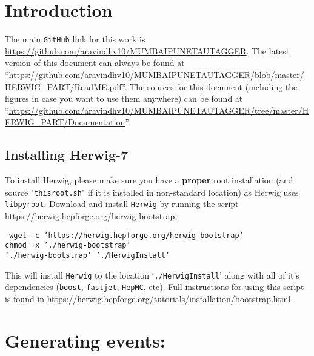 \section{Introduction}
The main {\tt GitHub} link for this work is \url{https://github.com/aravindhv10/MUMBAIPUNETAUTAGGER}.
The latest version of this document can always be found at ``\url{https://github.com/aravindhv10/MUMBAIPUNETAUTAGGER/blob/master/HERWIG_PART/ReadME.pdf}''.
The sources for this document (including the figures in case you want to use them anywhere) can be found at ``\url{https://github.com/aravindhv10/MUMBAIPUNETAUTAGGER/tree/master/HERWIG_PART/Documentation}''.

\subsection{Installing Herwig-7}
To install Herwig, please make sure you have a {\bf proper} root installation (and source "{\tt thisroot.sh}" if it is installed in non-standard location) as Herwig uses {\tt libpyroot}.
Download and install {\tt Herwig} by running the script \url{https://herwig.hepforge.org/herwig-bootstrap}:
\begin{center}
    \begin{minipage}{0.7\textwidth}
        {\tt
            wget -c '\url{https://herwig.hepforge.org/herwig-bootstrap}'\\
            chmod +x './herwig-bootstrap'\\
            './herwig-bootstrap' './HerwigInstall'
        }
    \end{minipage}
\end{center}
This will install {\tt Herwig} to the location `{\tt ./HerwigInstall}' along with all of it's dependencies ({\tt boost}, {\tt fastjet}, {\tt HepMC}, etc).
Full instructions for using this script is found in \url{https://herwig.hepforge.org/tutorials/installation/bootstrap.html}.

\section{Generating events:}
